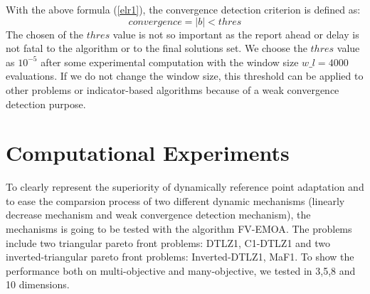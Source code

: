 \documentclass[conference]{IEEEtran}
\begin{document}
With the above formula (\ref{elr1}), the convergence detection criterion is defined as:
\begin{equation}\label{elr2}
  convergence = \lvert b \rvert < thres
\end{equation}
The chosen of the $thres$ value is not so important 
as the report ahead or delay is not fatal to the algorithm or to the final solutions set.
We choose the $thres$ value as $10^{-5}$ after some experimental computation with 
the window size $w\_ l = 4000$ evaluations. 
If we do not change the window size, 
this threshold can be applied to other problems or indicator-based algorithms
because of a weak convergence detection purpose.

% 
% 
%
\section{Computational Experiments}
To clearly represent the superiority of dynamically reference point adaptation 
and to ease the comparsion process of two different dynamic mechanisms
(linearly decrease mechanism and weak convergence detection mechanism), 
the mechanisms is going to be tested with the algorithm FV-EMOA\cite{FVEMOA}. %
The problems include two triangular pareto front problems: 
DTLZ1\cite{DTLZ1}, C1-DTLZ1\cite{C1DTLZ1}
and two inverted-triangular pareto front problems: 
Inverted-DTLZ1\cite{IDTLZ1}, MaF1\cite{MaF1}.
To show the performance both on multi-objective and many-objective, we tested in 3,5,8 and 10 dimensions.
\end{document}
